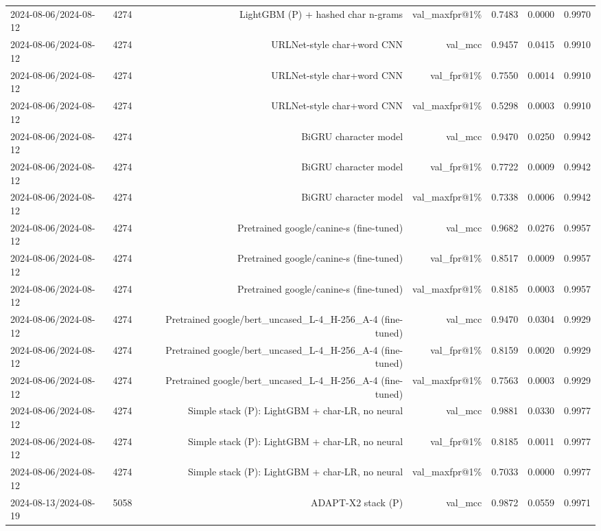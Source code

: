 \begin{table}[t]
\begin{tabular}{llrrrrr}
2024-08-06/2024-08-12 & 4274 & LightGBM (P) + hashed char n-grams & val\_maxfpr@1\% & 0.7483 & 0.0000 & 0.9970 \\
2024-08-06/2024-08-12 & 4274 & URLNet-style char+word CNN & val\_mcc & 0.9457 & 0.0415 & 0.9910 \\
2024-08-06/2024-08-12 & 4274 & URLNet-style char+word CNN & val\_fpr@1\% & 0.7550 & 0.0014 & 0.9910 \\
2024-08-06/2024-08-12 & 4274 & URLNet-style char+word CNN & val\_maxfpr@1\% & 0.5298 & 0.0003 & 0.9910 \\
2024-08-06/2024-08-12 & 4274 & BiGRU character model & val\_mcc & 0.9470 & 0.0250 & 0.9942 \\
2024-08-06/2024-08-12 & 4274 & BiGRU character model & val\_fpr@1\% & 0.7722 & 0.0009 & 0.9942 \\
2024-08-06/2024-08-12 & 4274 & BiGRU character model & val\_maxfpr@1\% & 0.7338 & 0.0006 & 0.9942 \\
2024-08-06/2024-08-12 & 4274 & Pretrained google/canine-s (fine-tuned) & val\_mcc & 0.9682 & 0.0276 & 0.9957 \\
2024-08-06/2024-08-12 & 4274 & Pretrained google/canine-s (fine-tuned) & val\_fpr@1\% & 0.8517 & 0.0009 & 0.9957 \\
2024-08-06/2024-08-12 & 4274 & Pretrained google/canine-s (fine-tuned) & val\_maxfpr@1\% & 0.8185 & 0.0003 & 0.9957 \\
2024-08-06/2024-08-12 & 4274 & Pretrained google/bert\_uncased\_L-4\_H-256\_A-4 (fine-tuned) & val\_mcc & 0.9470 & 0.0304 & 0.9929 \\
2024-08-06/2024-08-12 & 4274 & Pretrained google/bert\_uncased\_L-4\_H-256\_A-4 (fine-tuned) & val\_fpr@1\% & 0.8159 & 0.0020 & 0.9929 \\
2024-08-06/2024-08-12 & 4274 & Pretrained google/bert\_uncased\_L-4\_H-256\_A-4 (fine-tuned) & val\_maxfpr@1\% & 0.7563 & 0.0003 & 0.9929 \\
2024-08-06/2024-08-12 & 4274 & Simple stack (P): LightGBM + char-LR, no neural & val\_mcc & 0.9881 & 0.0330 & 0.9977 \\
2024-08-06/2024-08-12 & 4274 & Simple stack (P): LightGBM + char-LR, no neural & val\_fpr@1\% & 0.8185 & 0.0011 & 0.9977 \\
2024-08-06/2024-08-12 & 4274 & Simple stack (P): LightGBM + char-LR, no neural & val\_maxfpr@1\% & 0.7033 & 0.0000 & 0.9977 \\
2024-08-13/2024-08-19 & 5058 & ADAPT-X2 stack (P) & val\_mcc & 0.9872 & 0.0559 & 0.9971 \\

\end{tabular}
\end{table}
